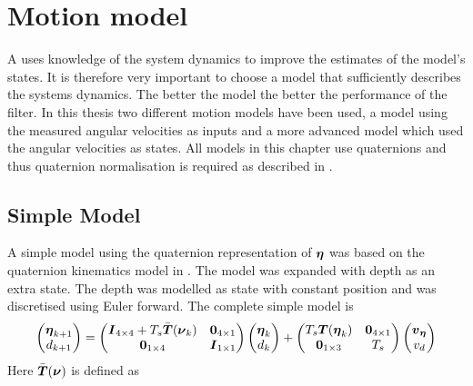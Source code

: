 \section{Motion model}
A \abbrKF uses knowledge of the system dynamics to improve the estimates of the model's states. It is therefore very important to choose a model that sufficiently describes the systems dynamics. The better the model the better the performance of the filter. In this thesis two different motion models have been used, a model using the measured angular velocities as inputs and a more advanced model which used the angular velocities as states. All models in this chapter use quaternions and thus quaternion normalisation is required as described in .

\subsection{Simple Model}\label{sec:simple_model}
A simple model using the quaternion representation of $\boldsymbol{\eta}$ was based on the quaternion kinematics model in \citet[p.47]{Tornqvist}. The model was expanded with depth as an extra state. The depth was modelled as state with constant position and was discretised using Euler forward. The complete simple model is 
\begin{equation}
\begin{pmatrix}
\boldsymbol{\eta}_{k+1}\\
d_{k+1}
\end{pmatrix} 
=
 \begin{pmatrix}
 \boldsymbol{I}_{4\times4} + T_s \bar{\boldsymbol{T}}(\boldsymbol{\nu}_k) & \boldsymbol{0}_{4\times1}\\
 \boldsymbol{0}_{1\times4} & \boldsymbol{I}_{1\times1} 
 \end{pmatrix}
 \begin{pmatrix}
 \boldsymbol{\eta}_{k}\\
 d_k
 \end{pmatrix}
 +
  \begin{pmatrix}
  T_s \boldsymbol{T}(\boldsymbol{\eta}_{k}) & \boldsymbol{0}_{4\times1}\\
  \boldsymbol{0}_{1\times3} & T_s
  \end{pmatrix}
  \begin{pmatrix}
  \boldsymbol{v}_{\boldsymbol{\eta}}\\
  v_d 
  \end{pmatrix}
\end{equation}
Here $\bar{\boldsymbol{T}}(\boldsymbol{\nu})$ is defined as
